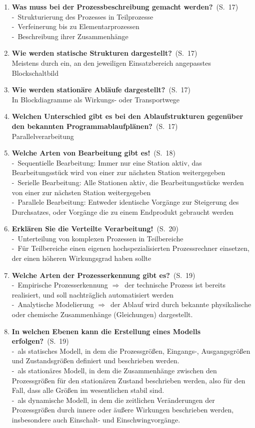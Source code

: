 \documentclass[a4paper,12pt]{article}
\newcommand{\question}[3]{\pagebreak[3]\item {\textbf{#1?}}\ (S.\ #2)#3}
\newcommand{\statement}[3]{\pagebreak[3]\item {\textbf{#1!}}\ (S.\ #2)#3}
\newcommand{\catchword}[1]{\\-\ #1}
\newcommand{\normaltext}[1]{\\#1}
\newcommand{\resultol}[1]{ $\Rightarrow$\ #1}
\newcommand{\page}[1]{#1}
\begin{document}
\begin{enumerate}
  \question{Was muss bei der Prozessbeschreibung gemacht werden}{\page{17}}
  {
    \catchword{Strukturierung des Prozesses in Teilprozesse}
    \catchword{Verfeinerung bis zu Elementarprozessen}
    \catchword{Beschreibung ihrer Zusammenhänge}
  }

  \question{Wie werden statische Strukturen dargestellt}{\page{17}}
  {
    \normaltext{Meistens durch ein, an den jeweiligen Einsatzbereich angepasstes Blockschaltbild}
  }

  \question{Wie werden stationäre Abläufe dargestellt}{\page{17}}
  {
    \normaltext{In Blockdiagramme als Wirkungs- oder Transportwege}
  }

  \question{Welchen Unterschied gibt es bei den Ablaufstrukturen gegenüber
            den bekannten Programmablaufplänen}{\page{17}}
  {
    \normaltext{Parallelverarbeitung}
  }

  \statement{Welche Arten von Bearbeitung gibt es}{\page{18}}
  {
    \catchword{Sequentielle Bearbeitung: Immer nur eine Station aktiv, das Bearbeitungsstück wird
               von einer zur nächsten Station weitergegeben}
    \catchword{Serielle Bearbeitung: Alle Stationen aktiv, die Bearbeitungsstücke werden von einer
               zur nächsten Station weitergegeben}
    \catchword{Parallele Bearbeitung: Entweder identische Vorgänge zur Steigerung des Durchsatzes,
               oder Vorgänge die zu einem Endprodukt gebraucht werden}
  }

  \statement{Erklären Sie die Verteilte Verarbeitung}{\page{20}}
  {
    \catchword{Unterteilung von komplexen Prozessen in Teilbereiche}
    \catchword{Für Teilbereiche einen eigenen hochspezialisierten Prozessrechner einsetzen,
               der einen höheren Wirkungsgrad haben sollte}
  }

  \question{Welche Arten der Prozesserkennung gibt es}{\page{19}}
  {
    \catchword{Empirische Prozesserkennung \resultol der technische Prozess ist bereits realisiert, und soll 
    nachträglich automatisiert werden}
    \catchword{Analytische Modelierung \resultol der Ablauf wird durch bekannte physikalische oder chemische
    Zusammenhänge (Gleichungen) dargestellt. }
  }

  \question{In welchen Ebenen kann die Erstellung eines Modells erfolgen}{\page{19}}
  {
    \catchword{als statisches Modell, in dem die Prozessgrößen, Eingangs-, Ausgangsgrößen und Zustandsgrößen
    definiert und beschrieben werden.}
    \catchword{als stationäres Modell, in dem die Zusammenhänge zwischen den Prozessgrößen für den stationären 
    Zustand beschrieben werden, also für den Fall, dass alle Größen im wesentlichen stabil sind.}
    \catchword{als dynamische Modell, in dem die zeitlichen Veränderungen der Prozessgrößen durch innere oder äußere 
    Wirkungen beschrieben werden, insbesondere auch Einschalt- und Einschwingvorgänge.}
  }


\end{enumerate}
\end{document}
